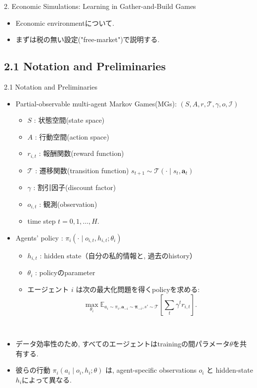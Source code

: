 \documentclass[unicode,aspectratio=169,11pt]{beamer}
\begin{document}
\begin{frame}{2. Economic Simulations: Learning in Gather-and-Build Games}{}
    \begin{itemize}
        \item Economic environmentについて.
        \item まずは税の無い設定("free-market")で説明する.
    \end{itemize}
\end{frame}

\subsection{2.1 Notation and Preliminaries}
\begin{frame}{2.1 Notation and Preliminaries}
    \begin{itemize}
        \item Partial-observable multi-agent Markov Games(MGs): $(S, A, r, \mathscr{T}, \gamma, o, \mathscr{I})$
        \begin{itemize}
            \item $S$ : 状態空間(state space)
            \item $A$ : 行動空間(action space)
            \item $r_{i,t}$ : 報酬関数(reward function)
            \item $\mathscr{T}$ : 遷移関数(transition function)  $s_{t+1} \sim \mathscr{T}(\cdot \mid s_t, \bm{a}_t)$
            \item $\gamma$ : 割引因子(discount factor)
            \item $o_{i,t}$ : 観測(observation)
            \item time step $t = 0, 1, \dots, H$.
        \end{itemize}
    \end{itemize}
\end{frame}

\begin{frame}{}{}
\begin{itemize}
    \item Agents' policy : $\pi_i(\cdot \mid o_{i,t}, h_{i,t}; \theta_i)$
    \begin{itemize}
        \item $h_{i,t}$ : hidden state（自分の私的情報と, 過去のhistory）
        \item $\theta_i$ : policyのparameter
        \item エージェント $i$ は次の最大化問題を得くpolicyを求める:
        \[
            \max_{\theta_i} \mathbb{E}_{a_i \sim \pi_i, \bm{a}_{-i} \sim \bm{\pi}_{-i}, s'\sim \mathscr{T}}\left[\sum_{t}\gamma^t r_{i,t}\right].
            \tag{1}
        \]
    \end{itemize}
    　
    \item データ効率性のため, すべてのエージェントはtrainingの間パラメータ$\theta$を共有する.
    \item 彼らの行動 $\pi_i(a_i\mid o_i, h_i; \theta)$ は, agent-specific observations $o_i$ と hidden-state $h_i$によって異なる.
\end{itemize}
\end{frame}
\end{document}
